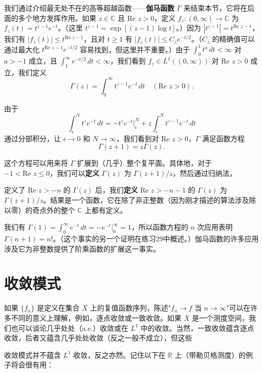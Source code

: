 \documentclass[lang=cn,10pt,thmcnt=section]{elegantbook}
\begin{document}
我们通过介绍最无处不在的高等超越函数——\textbf{伽马函数} $\Gamma$ 来结束本节，它将在后面的多个地方发挥作用。如果 $z \in \mathbb{C}$ 且 $\text{Re } z > 0$，定义 $f_z : (0,\infty) \to \mathbb{C}$ 为 $f_z(t) = t^{z-1}e^{-t}$。（这里 $t^{z-1} = \exp[(z-1)\log t]$。）因为 $|t^{z-1}| = t^{\text{Re }z-1}$，我们有 $|f_z(t)| \leq t^{\text{Re }z-1}$，且对 $t \geq 1$ 有 $|f_z(t)| \leq C_z e^{-t/2}$。（$C_z$ 的精确值可以通过最大化 $t^{\text{Re }z-1}e^{-t/2}$ 容易找到，但这里并不重要。）由于 $\int_0^1 t^a \,dt < \infty$ 对 $a > -1$ 成立，且 $\int_1^{\infty} e^{-t/2} \,dt < \infty$，我们看到 $f_z \in L^1((0,\infty))$ 对 $\text{Re }z > 0$ 成立，我们定义
\[ \Gamma(z) = \int_0^{\infty} t^{z-1}e^{-t} \,dt \quad (\text{Re }z > 0). \]

由于
\[ \int_{\epsilon}^{N} t^z e^{-t} \,dt = -t^z e^{-t}\big|_{\epsilon}^{N} + z \int_{\epsilon}^{N} t^{z-1}e^{-t} \,dt \]
通过分部积分，让 $\epsilon \to 0$ 和 $N \to \infty$，我们看到对 $\text{Re }z > 0$，$\Gamma$ 满足函数方程
\[ \Gamma(z+1) = z\Gamma(z). \]

这个方程可以用来将 $\Gamma$ 扩展到（几乎）整个复平面。具体地，对于 $-1 < \text{Re }z \leq 0$，我们可以\textbf{定义} $\Gamma(z)$ 为 $\Gamma(z+1)/z$，然后通过归纳法，

定义了 $\text{Re }z > -n$ 的 $\Gamma(z)$ 后，我们\textbf{定义} $\text{Re }z > -n-1$ 的 $\Gamma(z)$ 为 $\Gamma(z+1)/z$。结果是一个函数，它在除了非正整数（因为刚才描述的算法涉及除以零）的奇点外的整个 $\mathbb{C}$ 上都有定义。

我们有 $\Gamma(1) = \int_0^{\infty} e^{-t} \,dt = -e^{-t}\big|_0^{\infty} = 1$，所以函数方程的 $n$ 次应用表明 $\Gamma(n+1) = n!$。（这个事实的另一个证明在练习29中概述。）伽马函数的许多应用涉及它为非整数提供了阶乘函数的扩展这一事实。


\section{收敛模式}

如果 $\{f_n\}$ 是定义在集合 $X$ 上的复值函数序列，陈述"$f_n \to f$ 当 $n \to \infty$"可以在许多不同的意义上理解，例如，逐点收敛或一致收敛。如果 $X$ 是一个测度空间，我们也可以谈论几乎处处（a.e.）收敛或在 $L^1$ 中的收敛。当然，一致收敛蕴含逐点收敛，后者又蕴含几乎处处收敛（反之一般不成立），但这些

收敛模式并不蕴含 $L^1$ 收敛，反之亦然。记住以下在 $\mathbb{R}$ 上（带勒贝格测度）的例子将会很有用：
\end{document}
